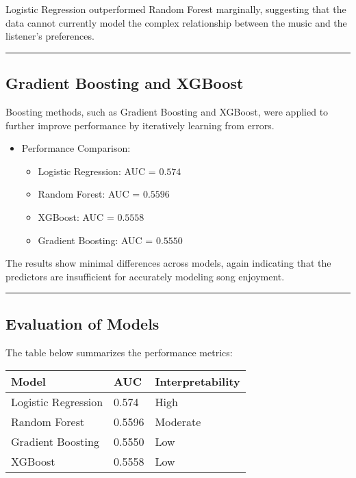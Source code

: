 \documentclass[11pt]{article}
\providecommand{\tightlist}{%
  \setlength{\itemsep}{0pt}\setlength{\parskip}{0pt}}
\begin{document}
Logistic Regression outperformed Random Forest marginally, suggesting
that the data cannot currently model the complex relationship between
the music and the listener's preferences.

\begin{center}\rule{0.5\linewidth}{0.5pt}\end{center}

\subsection{Gradient Boosting and
XGBoost}\label{gradient-boosting-and-xgboost}

Boosting methods, such as Gradient Boosting and XGBoost, were applied to
further improve performance by iteratively learning from errors.

\begin{itemize}
\tightlist
\item
  Performance Comparison:

  \begin{itemize}
  \tightlist
  \item
    Logistic Regression: AUC = \(0.574\)\\
  \item
    Random Forest: AUC = \(0.5596\)\\
  \item
    XGBoost: AUC = \(0.5558\)\\
  \item
    Gradient Boosting: AUC = \(0.5550\)
  \end{itemize}
\end{itemize}

The results show minimal differences across models, again indicating
that the predictors are insufficient for accurately modeling song
enjoyment.

\begin{center}\rule{0.5\linewidth}{0.5pt}\end{center}

\subsection{Evaluation of Models}\label{evaluation-of-models}

The table below summarizes the performance metrics:

\begin{longtable}[]{@{}lll@{}}
\toprule\noalign{}
Model & AUC & Interpretability \\
\midrule\noalign{}
\endhead
\bottomrule\noalign{}
\endlastfoot
Logistic Regression & 0.574 & High \\
Random Forest & 0.5596 & Moderate \\
Gradient Boosting & 0.5550 & Low \\
XGBoost & 0.5558 & Low \\
\end{longtable}
\end{document}
